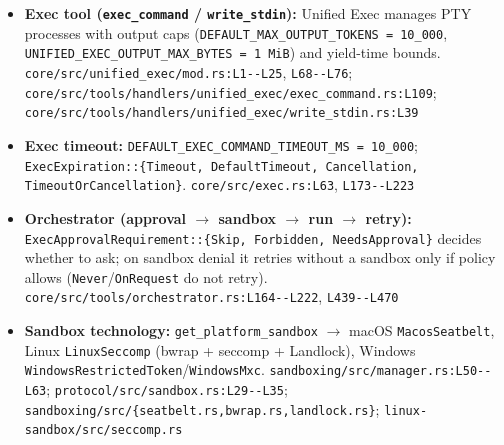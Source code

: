 \begin{itemize}
\item \textbf{Exec tool (\texttt{exec\_\allowbreak{}command} / \texttt{write\_\allowbreak{}stdin}):} Unified Exec manages PTY processes with output caps (\texttt{DEFAULT\_\allowbreak{}MAX\_\allowbreak{}OUTPUT\_\allowbreak{}TOKENS = 10\_\allowbreak{}000}, \texttt{UNIFIED\_\allowbreak{}EXEC\_\allowbreak{}OUTPUT\_\allowbreak{}MAX\_\allowbreak{}BYTES = 1 MiB}) and yield-time bounds. \texttt{core/\allowbreak{}src/\allowbreak{}unified\_\allowbreak{}exec/\allowbreak{}mod.\allowbreak{}rs:\allowbreak{}L1-\allowbreak{}-\allowbreak{}L25}, \texttt{L68-\allowbreak{}-\allowbreak{}L76}; \texttt{core/\allowbreak{}src/\allowbreak{}tools/\allowbreak{}handlers/\allowbreak{}unified\_\allowbreak{}exec/\allowbreak{}exec\_\allowbreak{}command.\allowbreak{}rs:\allowbreak{}L109}; \texttt{core/\allowbreak{}src/\allowbreak{}tools/\allowbreak{}handlers/\allowbreak{}unified\_\allowbreak{}exec/\allowbreak{}write\_\allowbreak{}stdin.\allowbreak{}rs:\allowbreak{}L39}
\item \textbf{Exec timeout:} \texttt{DEFAULT\_\allowbreak{}EXEC\_\allowbreak{}COMMAND\_\allowbreak{}TIMEOUT\_\allowbreak{}MS = 10\_\allowbreak{}000}; \texttt{ExecExpiration:\allowbreak{}:\allowbreak{}\{Timeout, DefaultTimeout, Cancellation, TimeoutOrCancellation\}}. \texttt{core/\allowbreak{}src/\allowbreak{}exec.\allowbreak{}rs:\allowbreak{}L63}, \texttt{L173-\allowbreak{}-\allowbreak{}L223}
\item \textbf{Orchestrator (approval $\rightarrow$ sandbox $\rightarrow$ run $\rightarrow$ retry):} \texttt{ExecApprovalRequirement:\allowbreak{}:\allowbreak{}\{Skip, Forbidden, NeedsApproval\}} decides whether to ask; on sandbox denial it retries without a sandbox only if policy allows (\texttt{Never}/\texttt{OnRequest} do not retry). \texttt{core/\allowbreak{}src/\allowbreak{}tools/\allowbreak{}orchestrator.\allowbreak{}rs:\allowbreak{}L164-\allowbreak{}-\allowbreak{}L222}, \texttt{L439-\allowbreak{}-\allowbreak{}L470}
\item \textbf{Sandbox technology:} \texttt{get\_\allowbreak{}platform\_\allowbreak{}sandbox} $\rightarrow$ macOS \texttt{MacosSeatbelt}, Linux \texttt{LinuxSeccomp} (bwrap + seccomp + Landlock), Windows \texttt{WindowsRestrictedToken}/\texttt{WindowsMxc}. \texttt{sandboxing/\allowbreak{}src/\allowbreak{}manager.\allowbreak{}rs:\allowbreak{}L50-\allowbreak{}-\allowbreak{}L63}; \texttt{protocol/\allowbreak{}src/\allowbreak{}sandbox.\allowbreak{}rs:\allowbreak{}L29-\allowbreak{}-\allowbreak{}L35}; \texttt{sandboxing/\allowbreak{}src/\allowbreak{}\{seatbelt.\allowbreak{}rs,bwrap.\allowbreak{}rs,landlock.\allowbreak{}rs\}}; \texttt{linux-\allowbreak{}sandbox/\allowbreak{}src/\allowbreak{}seccomp.\allowbreak{}rs}

\end{itemize}

